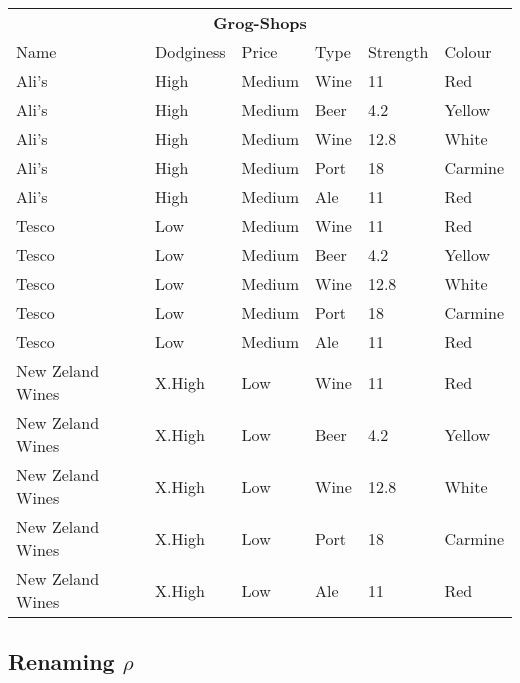 \begin{center}
  \begin{tabular}{llllll}
    \multicolumn{6}{c}{\textbf{Grog-Shops}}\\
    {Name}           & {Dodginess} & {Price} & {Type} & {Strength} & {Colour}\\ \hline
    Ali's            & High        & Medium  & Wine          & 11                & Red\\
    Ali's            & High        & Medium  & Beer          & 4.2               & Yellow\\
    Ali's            & High        & Medium  & Wine          & 12.8              & White\\
    Ali's            & High        & Medium  & Port          & 18                & Carmine\\
    Ali's            & High        & Medium  & Ale           & 11                & Red\\
    Tesco            & Low         & Medium  & Wine          & 11                & Red\\
    Tesco            & Low         & Medium  & Beer          & 4.2               & Yellow\\
    Tesco            & Low         & Medium  & Wine          & 12.8              & White\\
    Tesco            & Low         & Medium  & Port          & 18                & Carmine\\
    Tesco            & Low         & Medium  & Ale           & 11                & Red\\ 
    New Zeland Wines & X.High      & Low     & Wine          & 11                & Red\\
    New Zeland Wines & X.High      & Low     & Beer          & 4.2               & Yellow\\
    New Zeland Wines & X.High      & Low     & Wine          & 12.8              & White\\
    New Zeland Wines & X.High      & Low     & Port          & 18                & Carmine\\
    New Zeland Wines & X.High      & Low     & Ale           & 11                & Red\\
  \end{tabular}
\end{center}

\subsection{Renaming $\rho$}

